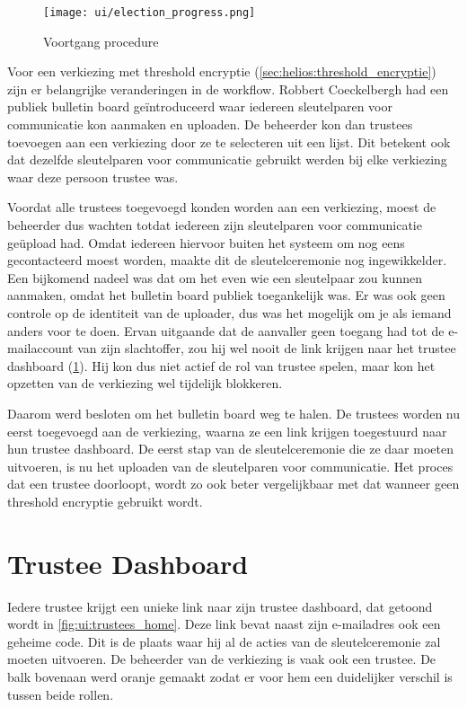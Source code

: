 \begin{figure}
  \centering
  \texttt{[image: ui/election\_progress.png]}
  \caption{Voortgang procedure}
  \label{fig:ui:election_progress}
\end{figure}

\npar Voor een verkiezing met threshold encryptie (\ref{sec:helios:threshold_encryptie}) zijn er belangrijke veranderingen in de workflow. Robbert Coeckelbergh had een publiek bulletin board ge\"introduceerd waar iedereen sleutelparen voor communicatie kon aanmaken en uploaden. De beheerder kon dan trustees toevoegen aan een verkiezing door ze te selecteren uit een lijst. Dit betekent ook dat dezelfde sleutelparen voor communicatie gebruikt werden bij elke verkiezing waar deze persoon trustee was.

\npar Voordat alle trustees toegevoegd konden worden aan een verkiezing, moest de beheerder dus wachten totdat iedereen zijn sleutelparen voor communicatie ge\"upload had. Omdat iedereen hiervoor buiten het systeem om nog eens gecontacteerd moest worden, maakte dit de sleutelceremonie nog ingewikkelder. Een bijkomend nadeel was dat om het even wie een sleutelpaar zou kunnen aanmaken, omdat het bulletin board publiek toegankelijk was. Er was ook geen controle op de identiteit van de uploader, dus was het mogelijk om je als iemand anders voor te doen. Ervan uitgaande dat de aanvaller geen toegang had tot de e-mailaccount van zijn slachtoffer, zou hij wel nooit de link krijgen naar het trustee dashboard (\ref{sec:ui:trustee_dashboard}). Hij kon dus niet actief de rol van trustee spelen, maar kon het opzetten van de verkiezing wel tijdelijk blokkeren.

\npar Daarom werd besloten om het bulletin board weg te halen. De trustees worden nu eerst toegevoegd aan de verkiezing, waarna ze een link krijgen toegestuurd naar hun trustee dashboard. De eerst stap van de sleutelceremonie die ze daar moeten uitvoeren, is nu het uploaden van de sleutelparen voor communicatie. Het proces dat een trustee doorloopt, wordt zo ook beter vergelijkbaar met dat wanneer geen threshold encryptie gebruikt wordt.

\section{Trustee Dashboard}
\label{sec:ui:trustee_dashboard}

Iedere trustee krijgt een unieke link naar zijn trustee dashboard, dat getoond wordt in \ref{fig:ui:trustees_home}. Deze link bevat naast zijn e-mailadres ook een geheime code. Dit is de plaats waar hij al de acties van de sleutelceremonie zal moeten uitvoeren. De beheerder van de verkiezing is vaak ook een trustee. De balk bovenaan werd oranje gemaakt zodat er voor hem een duidelijker verschil is tussen beide rollen.

